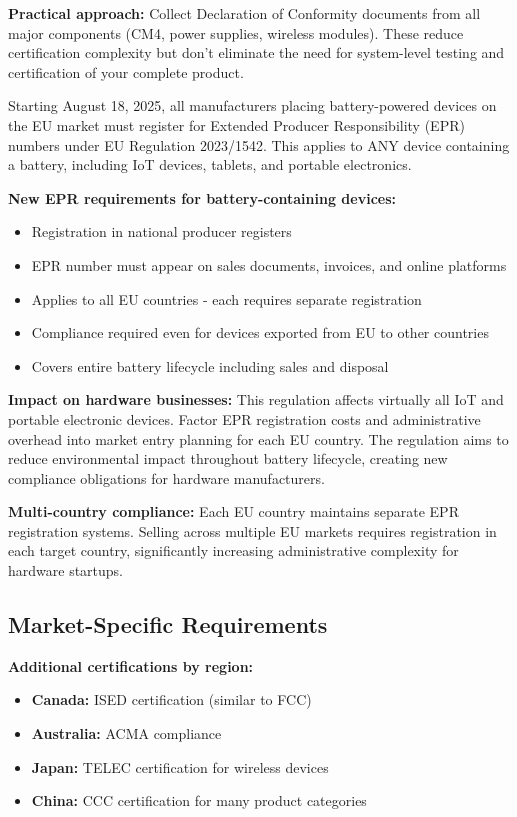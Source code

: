 \textbf{Practical approach:}
Collect Declaration of Conformity documents from all major components (CM4, power supplies, wireless modules). These reduce certification complexity but don't eliminate the need for system-level testing and certification of your complete product.

\begin{tcolorbox}[colback=red!10,colframe=red!75!black,title=Critical Change: EPR Registration Required from August 18 2025]
Starting August 18, 2025, all manufacturers placing battery-powered devices on the EU market must register for Extended Producer Responsibility (EPR) numbers under EU Regulation 2023/1542. This applies to ANY device containing a battery, including IoT devices, tablets, and portable electronics.
\end{tcolorbox}

\textbf{New EPR requirements for battery-containing devices:}
\begin{itemize}
\item Registration in national producer registers 
\item EPR number must appear on sales documents, invoices, and online platforms
\item Applies to all EU countries - each requires separate registration
\item Compliance required even for devices exported from EU to other countries
\item Covers entire battery lifecycle including sales and disposal
\end{itemize}


\textbf{Impact on hardware businesses:}
This regulation affects virtually all IoT and portable electronic devices. Factor EPR registration costs and administrative overhead into market entry planning for each EU country. The regulation aims to reduce environmental impact throughout battery lifecycle, creating new compliance obligations for hardware manufacturers.

\textbf{Multi-country compliance:}
Each EU country maintains separate EPR registration systems. Selling across multiple EU markets requires registration in each target country, significantly increasing administrative complexity for hardware startups.

\subsection{Market-Specific Requirements}

\textbf{Additional certifications by region:}
\begin{itemize}
\item \textbf{Canada:} ISED certification (similar to FCC)
\item \textbf{Australia:} ACMA compliance
\item \textbf{Japan:} TELEC certification for wireless devices
\item \textbf{China:} CCC certification for many product categories
\end{itemize}

